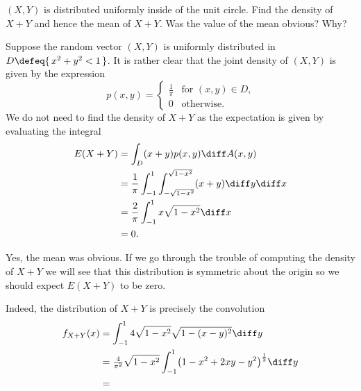 \begin{problem}[Handout 18, \# 15]
  \((X,Y)\) is distributed uniformly inside of the unit circle. Find the
  density of \(X+Y\) and hence the mean of \(X+Y\). Was the value of the
  mean obvious? Why?
\end{problem}
\begin{solution}
  Suppose the random vector \((X,Y)\) is uniformly distributed in
  \(D\defeq \{\,x^2+y^2<1\,\}\). It is rather clear that the joint density
  of \((X,Y)\) is given by the expression
  \[
    p(x,y)=
    \begin{cases}
      \frac{1}{\pi}&\text{for \((x,y)\in D\),}\\
      0&\text{otherwise.}
    \end{cases}
  \]
  We do not need to find the density of \(X+Y\) as the expectation is given
  by evaluating the integral
  \begin{align*}
    E(X+Y)
    &=\int_D (x+y)p(x,y)\diff A(x,y)\\
    &=\frac{1}{\pi}\int_{-1}^1\int_{-\sqrt{1-x^2}}^{\sqrt{1-x^2}} (x+y)\diff
      y\diff x\\
    &=\frac{2}{\pi}\int_{-1}^1x\sqrt{1-x^2}\diff x\\
    &=0.
  \end{align*}

  Yes, the mean was obvious. If we go through the trouble of computing the
  density of \(X+Y\) we will see that this distribution is symmetric about
  the origin so we should expect \(E(X+Y)\) to be zero.

  Indeed, the distribution of \(X+Y\) is precisely the convolution
  \begin{align*}
   f_{X+Y}(x)
    &=\int_{-1}^1 4\sqrt{1-x^2}\sqrt{1-(x-y)^2}\diff y\\
    &=\tfrac{4}{\pi^2}\sqrt{1-x^2}
      \int_{-1}^1\bigl(1-x^2+2xy-y^2\bigr)^{\frac{1}{2}}\diff y\\
    &=
  \end{align*}
\end{solution}
\newpage

